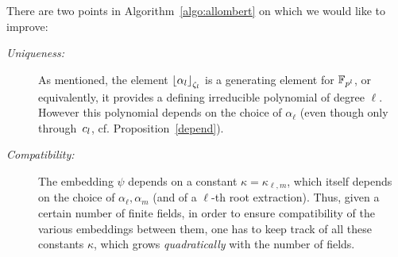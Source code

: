 \documentclass{sig-alternate}
\begin{document}
There are two points in Algorithm~\ref{algo:allombert} on which we would like to improve:
\begin{description}
\item[\emph{Uniqueness:}] As mentioned, the element $\left\lfloor \alpha_{l} \right\rfloor_{\zeta_l}$ is a generating element for $\mathbb{F}_{p^{l}}$,
or equivalently, it provides a defining irreducible polynomial of degree $\ell$.
However this polynomial depends on the choice of $\alpha_{\ell}$
(even though only through~$c_l$, cf. Proposition~\ref{depend}).
\item[\emph{Compatibility:}] The embedding $\psi$ depends on a constant $\kappa=\kappa_{\ell,m}$,
which itself depends on the choice of $\alpha_\ell,\alpha_m$ (and of a $\ell$-th root extraction).
Thus, given a certain number of finite fields, in order to ensure compatibility of the various
embeddings between them, one has to keep track of all these constants $\kappa$,
which grows \emph{quadratically} with the number of fields.
\end{description}
\end{document}
